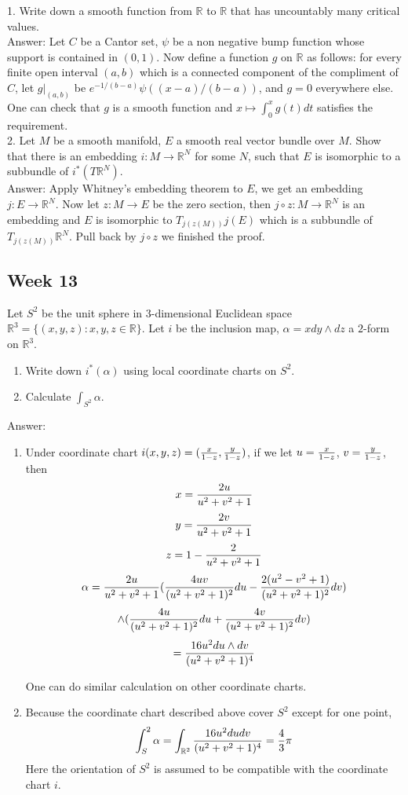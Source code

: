 \documentclass{article}
\theoremstyle{definition}
\begin{document}
1. Write down a smooth function from $\mathbb{R}$ to $\mathbb{R}$ that has uncountably many critical values.\\

Answer: Let $C$ be a Cantor set, $\psi$ be a non negative bump function whose support is contained in $(0, 1)$. Now define a function $g$ on $\mathbb{R}$ as follows: for every finite open interval $(a, b)$ which is a connected component of the compliment of $C$, let $g|_{(a, b)}$ be $e^{-1/(b-a)}\psi((x-a)/(b-a))$, and $g=0$ everywhere else. One can check that $g$ is a smooth function and $x\mapsto \int_0^x g(t)dt$ satisfies the requirement.\\

2. Let $M$ be a smooth manifold, $E$ a smooth real vector bundle over $M$. Show that there is an embedding $i: M\rightarrow \mathbb{R}^N$ for some $N$, such that $E$ is isomorphic to a subbundle of $i^*(T\mathbb{R}^N)$.\\

Answer: Apply Whitney's embedding theorem to $E$, we get an embedding $j: E\rightarrow \mathbb{R}^N$. Now let $z: M\rightarrow E$ be the zero section, then $j\circ z: M\rightarrow\mathbb{R}^N$ is an embedding and $E$ is isomorphic to $T_{j(z(M))}j(E)$ which is a subbundle of $T_{j(z(M))}\mathbb{R}^N$. Pull back by $j\circ z$ we finished the proof.


\newpage

\subsection{Week 13}

Let $S^2$ be the unit sphere in 3-dimensional Euclidean space $\mathbb{R}^3=\{(x, y, z): x, y, z\in\mathbb{R}\}$. Let $i$ be the inclusion map, $\alpha=xdy\wedge dz$ a $2$-form on $\mathbb{R}^3$.

\begin{enumerate}
    \item Write down $i^*(\alpha)$ using local coordinate charts on $S^2$.
    \item Calculate $\int_{S^2}\alpha$.
\end{enumerate}

Answer:
\begin{enumerate}
    \item Under coordinate chart $i(x, y, z)=({x\over 1-z}, {y\over 1-z})$,
    if we let $u={x\over 1-z}$, $v={y\over 1-z}$, then \[x={2u\over u^2+v^2+1}\] \[y={2v\over u^2+v^2+1}\] 
    \[z=1-{2\over u^2+v^2+1}\]
    \[\alpha={2u\over u^2+v^2+1}({4uv\over (u^2+v^2+1)^2}du-{2(u^2-v^2+1)\over (u^2+v^2+1)^2}dv)\]
    \[\wedge ({4u\over (u^2+v^2+1)^2}du+{4v\over(u^2+v^2+1)^2}dv)\]
    \[={16u^2du\wedge dv\over (u^2+v^2+1)^4}\]

    One can do similar calculation on other coordinate charts.
    \item Because the coordinate chart described above cover $S^2$ except for one point, 
    \[\int_S^2\alpha=\int_{\mathbb{R}^2} {16u^2dudv\over (u^2+v^2+1)^4}={4\over 3}\pi\]
    Here the orientation of $S^2$ is assumed to be compatible with the coordinate chart $i$.
\end{enumerate}
\end{document}
